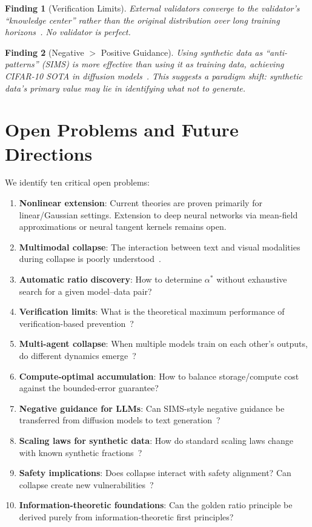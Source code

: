 \documentclass[11pt]{article}
\newtheorem{finding}{Finding}
\begin{document}
\begin{finding}[Verification Limits]
External validators converge to the validator's ``knowledge center'' rather than the original distribution over long training horizons~\citep{escaping2025}. No validator is perfect.
\end{finding}

\begin{finding}[Negative $>$ Positive Guidance]
Using synthetic data as ``anti-patterns'' (SIMS) is more effective than using it as training data, achieving CIFAR-10 SOTA in diffusion models~\citep{sims2024}. This suggests a paradigm shift: synthetic data's primary value may lie in identifying what \textit{not} to generate.
\end{finding}

\section{Open Problems and Future Directions}
\label{sec:open}

We identify ten critical open problems:

\begin{enumerate}[nosep]
    \item \textbf{Nonlinear extension}: Current theories are proven primarily for linear/Gaussian settings. Extension to deep neural networks via mean-field approximations or neural tangent kernels remains open.
    \item \textbf{Multimodal collapse}: The interaction between text and visual modalities during collapse is poorly understood~\citep{multimodal2025collapse}.
    \item \textbf{Automatic ratio discovery}: How to determine $\alpha^*$ without exhaustive search for a given model--data pair?
    \item \textbf{Verification limits}: What is the theoretical maximum performance of verification-based prevention~\citep{escaping2025}?
    \item \textbf{Multi-agent collapse}: When multiple models train on each other's outputs, do different dynamics emerge~\citep{syntheggs2025}?
    \item \textbf{Compute-optimal accumulation}: How to balance storage/compute cost against the bounded-error guarantee?
    \item \textbf{Negative guidance for LLMs}: Can SIMS-style negative guidance be transferred from diffusion models to text generation~\citep{sims2024,neon2025}?
    \item \textbf{Scaling laws for synthetic data}: How do standard scaling laws change with known synthetic fractions~\citep{scaling2025synthetic}?
    \item \textbf{Safety implications}: Does collapse interact with safety alignment? Can collapse create new vulnerabilities~\citep{hallucollapse2024}?
    \item \textbf{Information-theoretic foundations}: Can the golden ratio principle be derived purely from information-theoretic first principles?
\end{enumerate}
\end{document}

